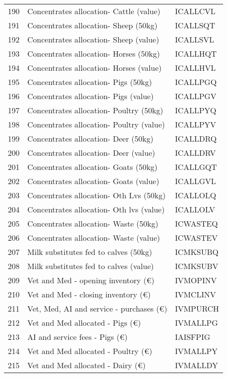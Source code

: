 \documentclass{article}\usepackage{graphicx, color}
\begin{document}
\begin{flushleft}
\begin{table}[ht]
\begin{center}
\begin{tabular}{rll}
  190 & Concentrates allocation- Cattle (value) & ICALLCVL \\ 
  191 & Concentrates allocation- Sheep (50kg) & ICALLSQT \\ 
  192 & Concentrates allocation- Sheep (value) & ICALLSVL \\ 
  193 & Concentrates allocation- Horses (50kg) & ICALLHQT \\ 
  194 & Concentrates allocation- Horses (value) & ICALLHVL \\ 
  195 & Concentrates allocation- Pigs  (50kg) & ICALLPGQ \\ 
  196 & Concentrates allocation- Pigs  (value) & ICALLPGV \\ 
  197 & Concentrates allocation- Poultry (50kg) & ICALLPYQ \\ 
  198 & Concentrates allocation- Poultry (value) & ICALLPYV \\ 
  199 & Concentrates allocation- Deer  (50kg) & ICALLDRQ \\ 
  200 & Concentrates allocation- Deer (value) & ICALLDRV \\ 
  201 & Concentrates allocation- Goats (50kg) & ICALLGQT \\ 
  202 & Concentrates allocation- Goats (value) & ICALLGVL \\ 
  203 & Concentrates allocation- Oth Lvs (50kg) & ICALLOLQ \\ 
  204 & Concentrates allocation- Oth lvs (value) & ICALLOLV \\ 
  205 & Concentrates allocation- Waste (50kg) & ICWASTEQ \\ 
  206 & Concentrates allocation- Waste (value) & ICWASTEV \\ 
  207 & Milk substitutes fed to calves (50kg) & ICMKSUBQ \\ 
  208 & Milk substitutes fed to calves (value) & ICMKSUBV \\ 
  209 & Vet and Med - opening inventory (€) & IVMOPINV \\ 
  210 & Vet and Med - closing inventory (€) & IVMCLINV \\ 
  211 & Vet, Med, AI and service - purchases (€) & IVMPURCH \\ 
  212 & Vet and Med allocated - Pigs    (€) & IVMALLPG \\ 
  213 & AI and service fees - Pigs      (€) & IAISFPIG \\ 
  214 & Vet and Med allocated - Poultry (€) & IVMALLPY \\ 
  215 & Vet and Med allocated - Dairy   (€) & IVMALLDY \\ 

\end{tabular}
\end{center}
\end{table}
\end{flushleft}
\end{document}
